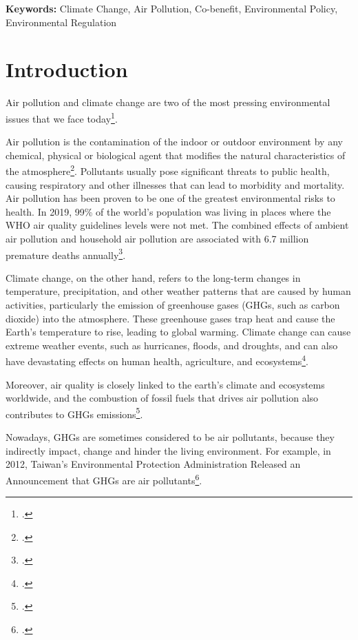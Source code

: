 \documentclass[]{article}
\begin{document}
\def\keywordstitle{Keywords}

\smallskip\noindent\textbf{Keywords: }{Climate Change, Air Pollution, Co-benefit, Environmental Policy, Environmental Regulation} 


\setcounter{tocdepth}{1}

\tableofcontents


\pagebreak

\section{Introduction}
\label{sec:intro}

Air pollution and climate change are two of the most pressing environmental issues that we face today\footcites{WorldBank}. 

Air pollution is the contamination of the indoor or outdoor environment by any chemical, physical or biological agent that modifies the natural characteristics of the atmosphere\footcite{WHO}.
Pollutants usually pose significant threats to public health, causing respiratory and other illnesses that can lead to morbidity and mortality. Air pollution has been proven to be one of the greatest environmental risks to health.
In 2019, 99\% of the world’s population was living in places where the WHO air quality guidelines levels were not met. The combined effects of ambient air pollution and household air pollution are associated with 6.7 million premature deaths annually\footcite{WHOAirOutdoor}.

Climate change, on the other hand, refers to the long-term changes in temperature, precipitation, and other weather patterns that are caused by human activities, particularly the emission of greenhouse gases (GHGs, such as carbon dioxide) into the atmosphere. These greenhouse gases trap heat and cause the Earth's temperature to rise, leading to global warming. Climate change can cause extreme weather events, such as hurricanes, floods, and droughts, and can also have devastating effects on human health, agriculture, and ecosystems\footcites{WorldBankClimateChange}.

Moreover, air quality is closely linked to the earth's climate and ecosystems worldwide, and the combustion of fossil fuels that drives air pollution also contributes to GHGs emissions\footcite{WHO}. 

Nowadays, GHGs are sometimes considered to be air pollutants, because they indirectly impact, change and hinder the living environment. For example, in 2012, Taiwan's Environmental Protection Administration Released an Announcement that GHGs are air pollutants\footcite{EPA2012}.
\end{document}
